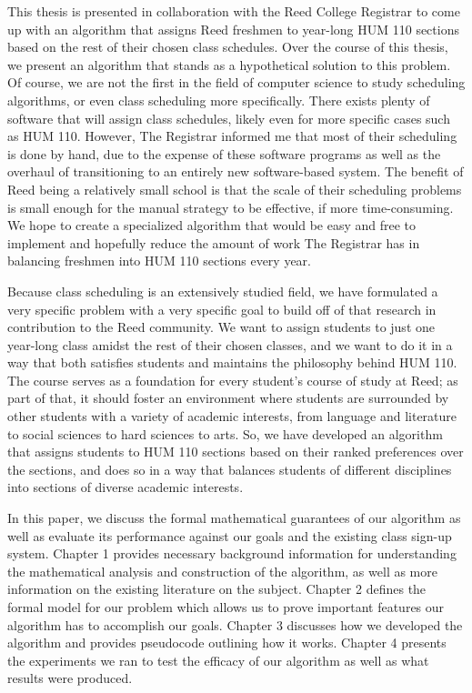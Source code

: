 This thesis is presented in collaboration with the Reed College Registrar to
come up with an algorithm that assigns Reed freshmen to year-long HUM 110
sections based on the rest of their chosen class schedules. Over the course of
this thesis, we present an algorithm that stands as a hypothetical solution to
this problem. Of course, we are not the first in the field of computer science
to study scheduling algorithms, or even class scheduling more specifically.
There exists plenty of software that will assign class schedules, likely even
for more specific cases such as HUM 110. However, The Registrar informed me that
most of their scheduling is done by hand, due to the expense of these software
programs as well as the overhaul of transitioning to an entirely new
software-based system. The benefit of Reed being a relatively small school is
that the scale of their scheduling problems is small enough for the manual
strategy to be effective, if more time-consuming. We hope to create a
specialized algorithm that would be easy and free to implement and hopefully
reduce the amount of work The Registrar has in balancing freshmen into HUM 110
sections every year.

Because class scheduling is an extensively studied field, we have formulated a
very specific problem with a very specific goal to build off of that research in
contribution to the Reed community. We want to assign students to just one
year-long class amidst the rest of their chosen classes, and we want to do it in
a way that both satisfies students and maintains the philosophy behind HUM 110.
The course serves as a foundation for every student's course of study at Reed;
as part of that, it should foster an
environment where students are surrounded by other students with a variety of
academic interests, from language and literature to
social sciences to hard sciences to arts. So, we have developed an algorithm that
assigns students to HUM 110 sections based on their ranked preferences over the
sections, and does so in a way that balances students of different disciplines
into sections of diverse academic interests.

In this paper, we discuss the formal mathematical guarantees of our algorithm as
well as evaluate its performance against our goals and the existing class
sign-up system. Chapter 1 provides necessary background information for
understanding the mathematical analysis and construction of the algorithm, as
well as more information on the existing literature on the subject. Chapter 2
defines the formal model for our problem which allows us to prove important
features our algorithm has to accomplish our goals. Chapter 3 discusses how we
developed the algorithm and provides pseudocode outlining how it works. Chapter
4 presents the experiments we ran to test the efficacy of our algorithm as well
as what results were produced.


